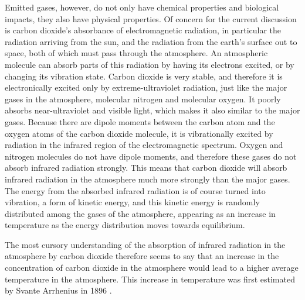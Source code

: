 Emitted gases, however, do not only have chemical properties and biological
impacts, they also have physical properties. Of concern for the current
discussion is carbon dioxide's absorbance of electromagnetic radiation, in
particular the radiation arriving from the sun, and the radiation from the
earth's surface out to space, both of which must pass through the atmosphere. An
atmospheric molecule can absorb parts of this radiation by having its electrons
excited, or by changing its vibration state. Carbon dioxide is very stable, and
therefore it is electronically excited only by extreme-ultraviolet radiation,
just like the major gases in the atmosphere, molecular nitrogen and molecular
oxygen. It poorly absorbs near-ultraviolet and visible light, which makes it
also similar to the major gases. Because there are dipole moments between the
carbon atom and the oxygen atoms of the carbon dioxide molecule, it is
vibrationally excited by radiation in the infrared region of the electromagnetic
spectrum. Oxygen and nitrogen molecules do not have dipole moments, and
therefore these gases do not absorb infrared radiation strongly. This means that
carbon dioxide will absorb infrared radiation in the atmosphere much more
strongly than the major gases. The energy from the absorbed infrared radiation
is of course turned into vibration, a form of kinetic energy, and this kinetic
energy is randomly distributed among the gases of the atmosphere, appearing as
an increase in temperature as the energy distribution moves towards equilibrium.

The most cursory understanding of the absorption of infrared radiation in the
atmosphere by carbon dioxide therefore seems to say that an increase in the
concentration of carbon dioxide in the atmosphere would lead to a higher average
temperature in the atmosphere. This increase in temperature was first estimated
by Svante Arrhenius in 1896 \autocite{Arrhenius1897}.

